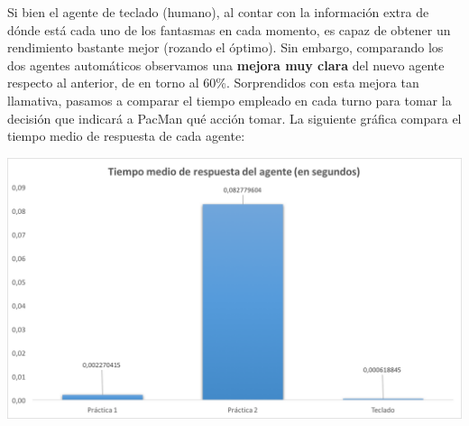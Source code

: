 \documentclass[12pt]{article}
\begin{document}
Si bien el agente de teclado (humano), al contar con la información extra de dónde está cada uno de los fantasmas en cada momento, es capaz de obtener un rendimiento bastante mejor (rozando el óptimo). Sin embargo, comparando los dos agentes automáticos observamos una \textbf{mejora muy clara} del nuevo agente respecto al anterior, de en torno al 60\%.
Sorprendidos con esta mejora tan llamativa, pasamos a comparar el tiempo empleado en cada turno para tomar la decisión que indicará a PacMan qué acción tomar. La siguiente gráfica compara el tiempo medio de respuesta de cada agente:


\begin{center}
    \includegraphics[width=15cm]{tiempoRespuesta}
\end{center}
\end{document}
